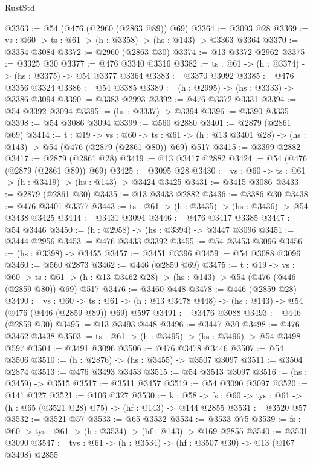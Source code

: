 \begin{lexlean}{RustStd}
\begin{coremodule}
@3363 := @54 (@476 (@2960 (@2863 @89)) @69)
@3364 := @3093 @28
@3369 := {vs : @60} -> {ts : @61} -> (h : @3358) -> (hs : @143) -> @3363 @3364
@3370 := @3354 @3084
@3372 := @2960 (@2863 @30)
@3374 := @13 @3372 @2962
@3375 := @3325 @30
@3377 := @476 @3340 @3316
@3382 := {ts : @61} -> (h : @3374) -> (hs : @3375) -> @54 @3377 @3364
@3383 := @3370 @3092
@3385 := @476 @3356 @3324
@3386 := @54 @3385
@3389 := (h : @2995) -> (hs : @3333) -> @3386 @3094
@3390 := @3383 @2993
@3392 := @476 @3372 @3331
@3394 := @54 @3392 @3094
@3395 := (hs : @3337) -> @3394
@3396 := @3390 @3335
@3398 := @54 @3086 @3094
@3399 := @560 @2880
@3401 := @2879 (@2861 @69)
@3414 := {t : @19} ->
  {vs : @60} ->
  {ts : @61} -> (h : @13 @3401 @28) -> (hs : @143) -> @54 (@476 (@2879 (@2861 @80)) @69) @517
@3415 := @3399 @2882
@3417 := @2879 (@2861 @28)
@3419 := @13 @3417 @2882
@3424 := @54 (@476 (@2879 (@2861 @89)) @69)
@3425 := @3095 @28
@3430 := {vs : @60} -> {ts : @61} -> (h : @3419) -> (hs : @143) -> @3424 @3425
@3431 := @3415 @3086
@3433 := @2879 (@2861 @30)
@3435 := @13 @3433 @2882
@3436 := @3386 @30
@3438 := @476 @3401 @3377
@3443 := {ts : @61} -> (h : @3435) -> (hs : @3436) -> @54 @3438 @3425
@3444 := @3431 @3094
@3446 := @476 @3417 @3385
@3447 := @54 @3446
@3450 := (h : @2958) -> (hs : @3394) -> @3447 @3096
@3451 := @3444 @2956
@3453 := @476 @3433 @3392
@3455 := @54 @3453 @3096
@3456 := (hs : @3398) -> @3455
@3457 := @3451 @3396
@3459 := @54 @3088 @3096
@3460 := @560 @2873
@3462 := @446 (@2859 @69)
@3475 := {t : @19} ->
  {vs : @60} ->
  {ts : @61} -> (h : @13 @3462 @28) -> (hs : @143) -> @54 (@476 (@446 (@2859 @80)) @69) @517
@3476 := @3460 @448
@3478 := @446 (@2859 @28)
@3490 := {vs : @60} ->
  {ts : @61} -> (h : @13 @3478 @448) -> (hs : @143) -> @54 (@476 (@446 (@2859 @89)) @69) @597
@3491 := @3476 @3088
@3493 := @446 (@2859 @30)
@3495 := @13 @3493 @448
@3496 := @3447 @30
@3498 := @476 @3462 @3438
@3503 := {ts : @61} -> (h : @3495) -> (hs : @3496) -> @54 @3498 @597
@3504 := @3491 @3096
@3506 := @476 @3478 @3446
@3507 := @54 @3506
@3510 := (h : @2876) -> (hs : @3455) -> @3507 @3097
@3511 := @3504 @2874
@3513 := @476 @3493 @3453
@3515 := @54 @3513 @3097
@3516 := (hs : @3459) -> @3515
@3517 := @3511 @3457
@3519 := @54 @3090 @3097
@3520 := @141 @327
@3521 := @106 @327
@3530 := {k : @58} ->
  {fs : @60} -> {tys : @61} -> (h : @65 (@3521 @28) @75) -> (hf : @143) -> @144 @2855
@3531 := @3520 @57
@3532 := @3521 @57
@3533 := @65 @3532
@3534 := @3533 @75
@3539 := {fs : @60} -> {tys : @61} -> (h : @3534) -> (hf : @143) -> @169 @2855
@3540 := @3531 @3090
@3547 := {tys : @61} -> (h : @3534) -> (hf : @3507 @30) -> @13 (@167 @3498) @2855

\end{coremodule}
\end{lexlean}
